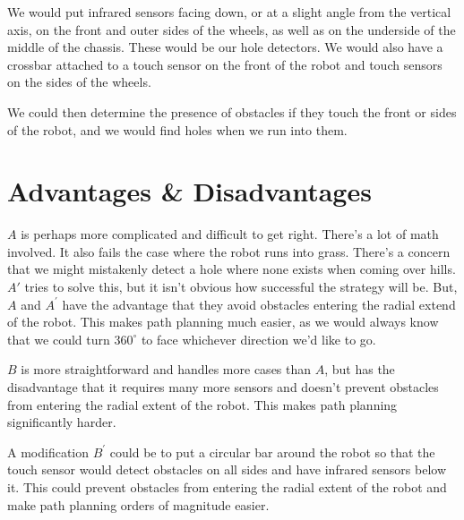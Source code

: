 \documentclass[letterpaper]{article}
\begin{document}
We would put infrared sensors facing down, or at a slight angle from the vertical axis, on the front and outer sides of the wheels, as well as on the underside of the middle of the chassis. These would be our hole detectors. We would also have a crossbar attached to a touch sensor on the front of the robot and touch sensors on the sides of the wheels.

We could then determine the presence of obstacles if they touch the front or sides of the robot, and we would find holes when we run into them.

\section*{Advantages \& Disadvantages}
\label{sec:orgdf991c9}

\(A\) is perhaps more complicated and difficult to get right. There's a lot of math involved. It also fails the case where the robot runs into grass. There's a concern that we might mistakenly detect a hole where none exists when coming over hills. \(A'\) tries to solve this, but it isn't obvious how successful the strategy will be. But, \(A\) and \(A^'\) have the advantage that they avoid obstacles entering the radial extend of the robot. This makes path planning much easier, as we would always know that we could turn \(360^{\circ}\) to face whichever direction we'd like to go.

\(B\) is more straightforward and handles more cases than \(A\), but has the disadvantage that it requires many more sensors and doesn't prevent obstacles from entering the radial extent of the robot. This makes path planning significantly harder.

A modification \(B^'\) could be to put a circular bar around the robot so that the touch sensor would detect obstacles on all sides and have infrared sensors below it. This could prevent obstacles from entering the radial extent of the robot and make path planning orders of magnitude easier.
\end{document}
